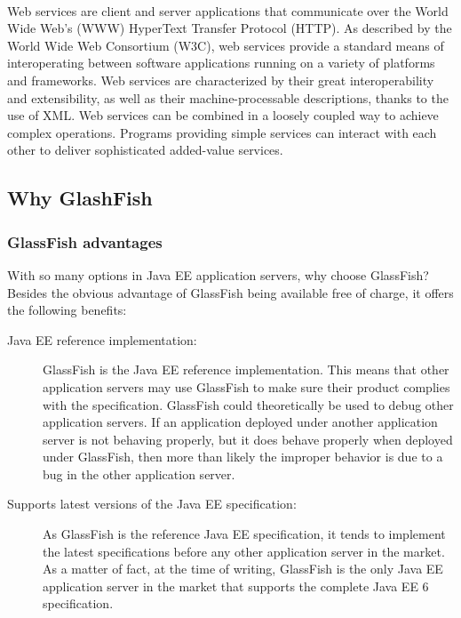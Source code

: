 \paragraph{}
Web services are client and server applications that communicate over the World Wide Web’s (WWW) HyperText Transfer Protocol (HTTP). As described by the World Wide Web Consortium (W3C), web services provide a standard means of interoperating between software applications running on a variety of platforms and frameworks. Web services are characterized by their great interoperability and extensibility, as well as their machine-processable descriptions, thanks to the use of XML. Web services can be combined in a loosely coupled way to achieve complex operations. Programs providing simple services can interact with each other to deliver sophisticated added-value services.

\subsection{Why GlashFish}
\subsubsection{GlassFish advantages}
With so many options in Java EE application servers, why choose GlassFish? Besides
the obvious advantage of GlassFish being available free of charge, it offers the
following benefits:
\begin{description}
\item[Java EE reference implementation:]
GlassFish is the Java EE reference implementation. This means that other application servers may use GlassFish to make sure their product complies with the specification. GlassFish could
theoretically be used to debug other application servers. If an application deployed under another application server is not behaving properly, but it does behave properly when deployed under GlassFish, then more than likely the improper behavior is due to a bug in the other application server.

\item[Supports latest versions of the Java EE specification:]
As GlassFish is the reference Java EE specification, it tends to implement the latest specifications before any other application server in the market. As a matter of fact, at the time of writing, GlassFish is the only Java EE application server in the market that supports the complete Java EE 6 specification.
\end{description}

